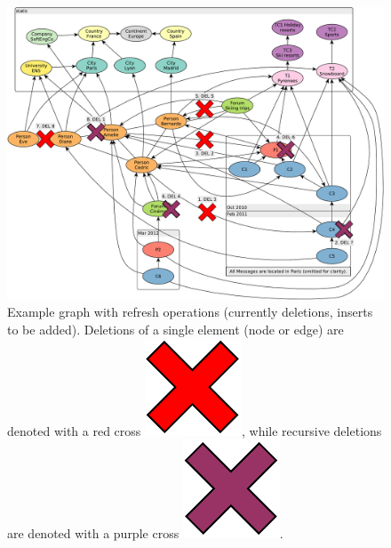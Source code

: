 \begin{figure}[ht]
    \centering
    \includegraphics[scale=\yedscale]{figures/example-graph-with-refreshes}
    \caption{Example graph with refresh operations (currently deletions, inserts to be added).
    Deletions of a single element (node or edge) are denoted with a red cross \includegraphics[scale=0.14]{patterns/delete-single}, while recursive deletions are denoted with a purple cross \includegraphics[scale=0.14]{patterns/delete-recursively}.}
    \label{fig:example-graph-with-refreshes}
\end{figure}
